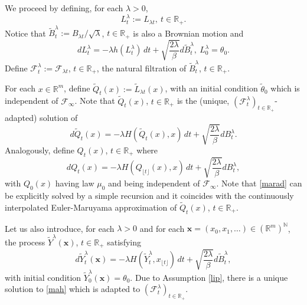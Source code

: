 \documentclass[a4paper,draft]{article}
\begin{document}
We proceed by defining, for each $\lambda>0$,
$$
L^{\lambda}_t:=L_{\lambda t},\ t\in\mathbb{R}_+.
$$
Notice that $\tilde{B}^{\lambda}_t:=B_{\lambda t}/\sqrt{\lambda}$, $t\in\mathbb{R}_+$
is also a Brownian motion and
\begin{equation}\label{kell}
dL^{\lambda}_t=-\lambda h(L^{\lambda}_t)\, dt+\sqrt{\frac{2\lambda}{\beta}}d\tilde{B}^{\lambda}_t,\
L^{\lambda}_0=\theta_0.
\end{equation}
Define $\mathcal{F}_t^{\lambda}:=\mathcal{F}_{\lambda t}$, $t\in\mathbb{R}_+$, the natural
filtration of $\tilde{B}^{\lambda}_t$, $t\in\mathbb{R}_+$.

For each $x\in\mathbb{R}^m$,
define $\tilde{Q}_{t}(x):=\tilde{L}_{\lambda t}(x)$,
with an initial condition $\tilde{\theta}_0$
which is independent of $\mathcal{F}_{\infty}$.
Note that $\tilde{Q}_t(x)$, $t\in \mathbb{R}_+$ is the (unique, $(\mathcal{F}_t^{\lambda})_{t\in\mathbb{R}_+}$-adapted) solution of
\begin{equation}\label{seuso}
d\tilde{Q}_t(x)=-\lambda H(\tilde{Q}_t(x),x)\, dt+\sqrt{\frac{2\lambda}{\beta}}dB^{\lambda}_t.
\end{equation}
Analogously,
define $Q_t(x)$, $t\in\mathbb{R}_+$
where
\begin{equation}\label{marad}
d{Q}_t(x)=-\lambda H({Q}_{\lfloor t\rfloor}(x),x)\, dt+\sqrt{\frac{2\lambda}{\beta}}dB^{\lambda}_t,
\end{equation}
with $Q_0(x)$ having law $\mu_0$ and being independent of $\mathcal{F}_{\infty}$.
Note that \eqref{marad} can be explicitly solved by a simple recursion and it coincides
with the continuously interpolated Euler-Maruyama approximation of $\tilde{Q}_t(x)$, $t\in\mathbb{R}_+$.

Let us also introduce, for each $\lambda>0$ and for each
$\mathbf{x}=(x_0,x_1,\ldots)\in(\mathbb{R}^m)^{\mathbb{N}}$, the process $\tilde{Y}^{\lambda}(\mathbf{x})$,
$t\in\mathbb{R}_+$ satisfying
\begin{equation}\label{mah}
d\tilde{Y}^{\lambda}_t(\mathbf{x})=-\lambda H(\tilde{Y}^{\lambda}_t,
x_{\lfloor t\rfloor})\, dt+\sqrt{\frac{2\lambda}{\beta}}d\tilde{B}^{\lambda}_{t},
\end{equation}
with initial condition $\tilde{Y}^{\lambda}_0(\mathbf{x})=\theta_0$.
Due to Assumption \ref{lip}, there is a unique
solution to \eqref{mah} which is adapted to
$(\mathcal{F}_t^{\lambda})_{t\in\mathbb{R}_+}$.
\end{document}
